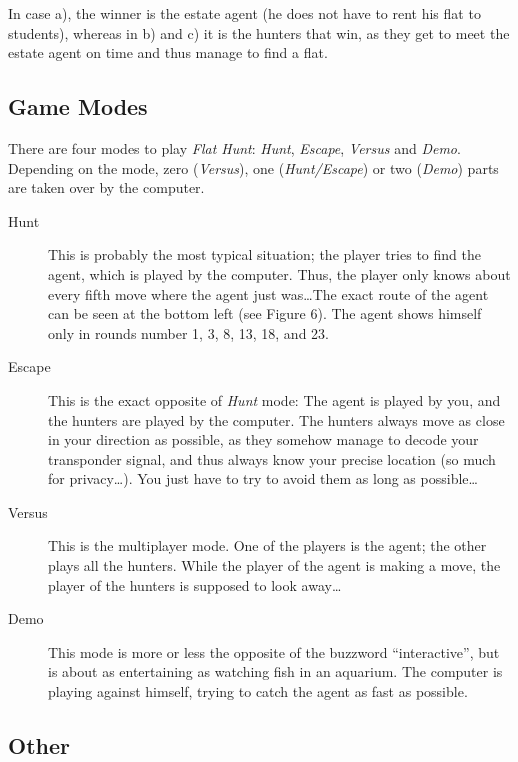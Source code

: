 In case a), the winner is the estate agent (he does not have to rent his flat to students), whereas in b) and c) it is the hunters that win, as they get to meet the estate agent on time and thus manage to find a flat.

\subsection{Game Modes}
There are four modes to play \emph{Flat Hunt}: \emph{Hunt}, \emph{Escape}, \emph{Versus} and \emph{Demo}. Depending on the mode, zero (\emph{Versus}), one (\emph{Hunt/Escape}) or two (\emph{Demo}) parts are taken over by the computer.

  \begin{description}
    
    \item[Hunt]This is probably the most typical situation; the player tries to find the agent, which is played by the computer. Thus, the player only knows about every fifth move where the agent just was\ldots The exact route of the agent can be seen at the bottom left (see Figure 6). The agent shows himself only in rounds number 1, 3, 8, 13, 18, and 23.
    
    \item[Escape]This is the exact opposite of \emph{Hunt} mode: The agent is played by you, and the hunters are played by the computer. The hunters always move as close in your direction as possible, as they somehow manage to decode your transponder signal, and thus always know your precise location (so much for privacy\ldots). You just have to try to avoid them as long as possible\ldots
  
    \item[Versus]This is the multiplayer mode. One of the players is the agent; the other plays all the hunters. While the player of the agent is making a move, the player of the hunters is supposed to look away\ldots
    
    \item[Demo]This mode is more or less the opposite of the buzzword ``interactive'', but is about as entertaining as watching fish in an aquarium. The computer is playing against himself, trying to catch the agent as fast as possible.
  \end{description}

  \subsection{Other}

